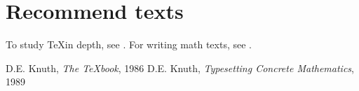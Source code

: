 \documentclass{article}
\begin{document}
\section*{Recommend texts}

To study \TeX in depth, see \cite{DK86}. For writing math texts, see \cite{DK89}.
\begin{thebibliography}{Knuth89}
 D.E. Knuth, \emph{The {\TeX}book}, 1986
 D.E. Knuth, \emph{Typesetting Concrete Mathematics}, 1989
\end{thebibliography}
\end{document}
